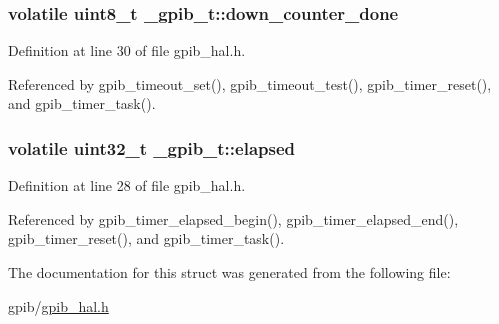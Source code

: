 \subsubsection[{\texorpdfstring{down\+\_\+counter\+\_\+done}{down_counter_done}}]{\setlength{\rightskip}{0pt plus 5cm}volatile uint8\+\_\+t \+\_\+gpib\+\_\+t\+::down\+\_\+counter\+\_\+done}\hypertarget{struct__gpib__t_af2622dd8668ecb24c42a2da2d8956538}{}\label{struct__gpib__t_af2622dd8668ecb24c42a2da2d8956538}


Definition at line 30 of file gpib\+\_\+hal.\+h.



Referenced by gpib\+\_\+timeout\+\_\+set(), gpib\+\_\+timeout\+\_\+test(), gpib\+\_\+timer\+\_\+reset(), and gpib\+\_\+timer\+\_\+task().

\subsubsection[{\texorpdfstring{elapsed}{elapsed}}]{\setlength{\rightskip}{0pt plus 5cm}volatile uint32\+\_\+t \+\_\+gpib\+\_\+t\+::elapsed}\hypertarget{struct__gpib__t_a99a38aef880eb075f625f33d7bac31dd}{}\label{struct__gpib__t_a99a38aef880eb075f625f33d7bac31dd}


Definition at line 28 of file gpib\+\_\+hal.\+h.



Referenced by gpib\+\_\+timer\+\_\+elapsed\+\_\+begin(), gpib\+\_\+timer\+\_\+elapsed\+\_\+end(), gpib\+\_\+timer\+\_\+reset(), and gpib\+\_\+timer\+\_\+task().



The documentation for this struct was generated from the following file\+:\begin{DoxyCompactItemize}
\item 
gpib/\hyperlink{gpib__hal_8h}{gpib\+\_\+hal.\+h}\end{DoxyCompactItemize}
